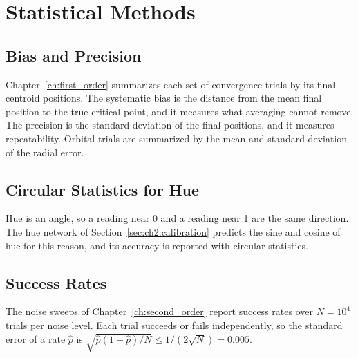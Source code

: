 \chapter{Statistical Methods}
\label{app:statistics}

\section{Bias and Precision}
Chapter~\ref{ch:first_order} summarizes each set of convergence trials by
its final centroid positions. The systematic bias is the distance from
the mean final position to the true critical point, and it measures what
averaging cannot remove. The precision is the standard deviation of the
final positions, and it measures repeatability. Orbital trials are
summarized by the mean and standard deviation of the radial error.

\section{Circular Statistics for Hue}
Hue is an angle, so a reading near 0 and a reading near 1 are the same
direction. The hue network of Section~\ref{sec:ch2:calibration} predicts
the sine and cosine of hue for this reason, and its accuracy is reported
with circular statistics.

\section{Success Rates}
The noise sweeps of Chapter~\ref{ch:second_order} report success rates
over $N = 10^4$ trials per noise level. Each trial succeeds or fails
independently, so the standard error of a rate $\hat{p}$ is
$\sqrt{\hat{p}(1-\hat{p})/N} \leq 1/(2\sqrt{N}) = 0.005$.
